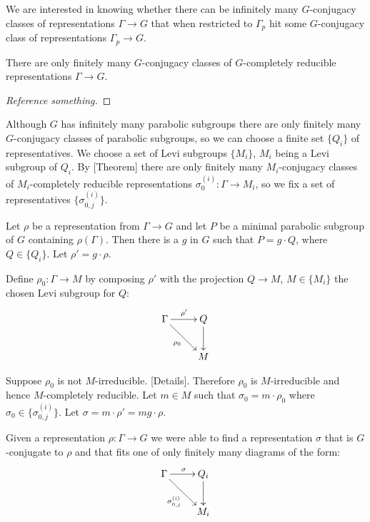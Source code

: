We are interested in knowing whether there can be infinitely many $G$-conjugacy classes of representations $\Gamma\rightarrow G$ that when restricted to $\Gamma_p$ hit some $G$-conjugacy class of representations $\Gamma_p\rightarrow G$. 

\begin{theorem} There are only finitely many $G$-conjugacy classes of $G$-completely reducible representations $\Gamma\rightarrow G$.
\end{theorem}
\begin{proof}[Reference something]
\end{proof}

Although $G$ has infinitely many parabolic subgroups there are only finitely many $G$-conjugacy classes of parabolic subgroups, so we can choose a finite set $\{Q_i\}$ of representatives. We choose a set of Levi subgroups $\{M_i\}$, $M_i$ being a Levi subgroup of $Q_i$. By [Theorem] there are only finitely many $M_i$-conjugacy classes of $M_i$-completely reducible representations $\sigma^{(i)}_0:\Gamma\rightarrow M_i$, so we fix a set of representatives $\{\sigma^{(i)}_{0,j}\}$.

Let $\rho$ be a representation from $\Gamma\rightarrow G$ and let $P$ be a minimal parabolic subgroup of $G$ containing $\rho(\Gamma)$. Then there is a $g$ in $G$ such that $P = g\cdot Q$, where $Q\in\{Q_i\}$. Let $\rho' = g\cdot \rho$. 

Define $\rho_0:\Gamma\rightarrow M$ by composing $\rho'$ with the projection $Q\rightarrow M$, $M\in\{M_i\}$ the chosen Levi subgroup for $Q$:
\begin{displaymath}
	\xymatrix{
	\Gamma \ar[r]^{\rho'} \ar[rd]_{\rho_0} & Q \ar[d]\\
	& M}
\end{displaymath}

Suppose $\rho_0$ is not $M$-irreducible. [Details]. Therefore $\rho_0$ is $M$-irreducible and hence $M$-completely reducible. Let $m\in M$ such that $\sigma_0 = m\cdot \rho_0$ where $\sigma_0\in\{\sigma^{(i)}_{0,j}\}$. Let $\sigma = m\cdot \rho' = mg\cdot \rho$.

Given a representation $\rho:\Gamma\rightarrow G$ we were able to find a representation $\sigma$ that is $G$-conjugate to $\rho$ and that fits one of only finitely many diagrams of the form:
\begin{displaymath}
	\xymatrix{
	\Gamma \ar[r]^{\sigma} \ar[rd]_{\sigma^{(i)}_{0,j}} & Q_i \ar[d]\\
	& M_i}
\end{displaymath}

